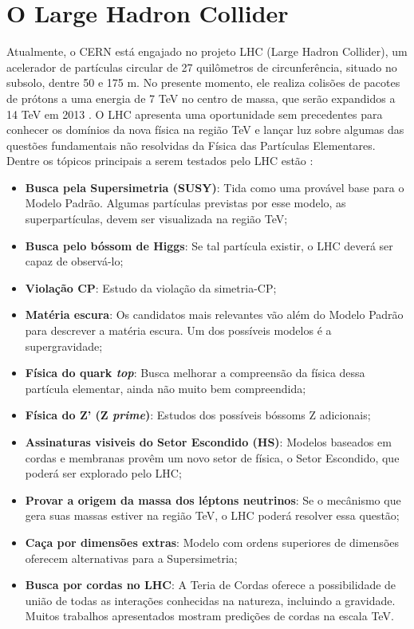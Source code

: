 \section{O Large Hadron Collider}
\label{sec:lhc}

Atualmente, o CERN está engajado no projeto LHC (Large Hadron
Collider), um acelerador de partículas circular de 27 quilômetros de
circunferência, situado no subsolo, dentre 50 e 175 m. 
No presente momento, ele realiza colisões de pacotes de prótons a uma energia
de 7 TeV no centro de massa, que serão expandidos a 14 TeV em 2013 \cite{webATLAS}.
O LHC apresenta uma oportunidade sem precedentes para conhecer os domínios da
nova física na região TeV e lançar luz sobre algumas das questões fundamentais
não resolvidas da Física das Partículas Elementares. 
Dentre os tópicos principais a serem testados pelo LHC estão \cite{hunt_for_physics}:

\begin{itemize}
\item \textbf{Busca pela Supersimetria (SUSY)}: Tida como uma provável base para o Modelo
Padrão\cite{Intro_Standard}. Algumas partículas previstas por esse modelo, as superpartículas, 
devem ser visualizada na região TeV;
\item \textbf{Busca pelo bóssom de Higgs}: Se tal partícula existir, o LHC deverá ser capaz de
observá-lo;
\item \textbf{Violação CP}: Estudo da violação da simetria-CP;
\item \textbf{Matéria escura}: Os candidatos mais relevantes vão além do Modelo
Padrão para descrever a matéria escura. Um dos possíveis modelos é a supergravidade;
\item \textbf{Física do quark \emph{top}}: Busca melhorar a compreensão da física dessa
partícula elementar, ainda não muito bem compreendida;
\item \textbf{Física do Z' (Z \emph{prime})}: Estudos dos possíveis bóssoms Z adicionais; 
\item \textbf{Assinaturas visiveis do Setor Escondido (HS)}: Modelos baseados em
cordas e membranas provêm um novo setor de física, o Setor Escondido, que poderá ser
explorado pelo LHC;
\item \textbf{Provar a origem da massa dos léptons neutrinos}: Se o mecânismo que gera
suas massas estiver na região TeV, o LHC poderá resolver essa questão;
\item \textbf{Caça por dimensões extras}: Modelo com ordens superiores de dimensões
oferecem alternativas para a Supersimetria;
\item \textbf{Busca por cordas no LHC}: A Teria de Cordas oferece a possibilidade de
união de todas as interações conhecidas na natureza, incluindo a gravidade. Muitos
trabalhos apresentados mostram predições de cordas na escala TeV.
\end{itemize}

